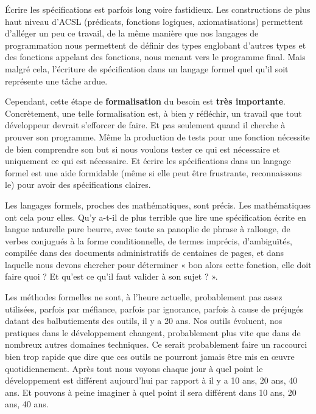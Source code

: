 Écrire les spécifications est parfois long voire fastidieux. Les constructions 
de plus haut niveau d'ACSL (prédicats, fonctions logiques, axiomatisations) 
permettent d'alléger un peu ce travail, de la même manière que nos langages de
programmation nous permettent de définir des types englobant d'autres types et
des fonctions appelant des fonctions, nous menant vers le programme final. Mais
malgré cela, l'écriture de spécification dans un langage formel quel qu'il soit
représente une tâche ardue.



Cependant, cette étape de \textbf{formalisation} du besoin est \textbf{très importante}. 
Concrètement, une telle formalisation est, à bien y réfléchir, un travail que 
tout développeur devrait s'efforcer de faire. Et pas seulement quand il cherche 
à prouver son programme. Même la production de tests pour une fonction 
nécessite de bien comprendre son but si nous voulons tester ce qui est nécessaire 
et uniquement ce qui est nécessaire. Et écrire les spécifications dans un 
langage formel est une aide formidable (même si elle peut être frustrante, 
reconnaissons le) pour avoir des spécifications claires.



Les langages formels, proches des mathématiques, sont précis. Les mathématiques
ont cela pour elles. Qu'y a-t-il de plus terrible que lire une spécification 
écrite en langue naturelle pure beurre, avec toute sa panoplie de phrase à 
rallonge, de verbes conjugués à la forme conditionnelle, de termes imprécis, 
d'ambiguïtés, compilée dans des documents administratifs de centaines de pages,
et dans laquelle nous devons chercher pour déterminer « bon alors cette fonction, 
elle doit faire quoi ? Et qu'est ce qu'il faut valider à son sujet ? ».



Les méthodes formelles ne sont, à l'heure actuelle, probablement pas assez 
utilisées, parfois par méfiance, parfois par ignorance, parfois à cause de 
préjugés datant des balbutiements des outils, il y a 20 ans. Nos outils
évoluent, nos pratiques dans le développement changent, probablement plus
vite que dans de nombreux autres domaines techniques. Ce serait probablement
faire un raccourci bien trop rapide que dire que ces outils ne pourront 
jamais être mis en œuvre quotidiennement. Après tout nous voyons chaque jour
à quel point le développement est différent aujourd'hui par rapport à il y a
10 ans, 20 ans, 40 ans. Et pouvons à peine imaginer à quel point il sera 
différent dans 10 ans, 20 ans, 40 ans.



